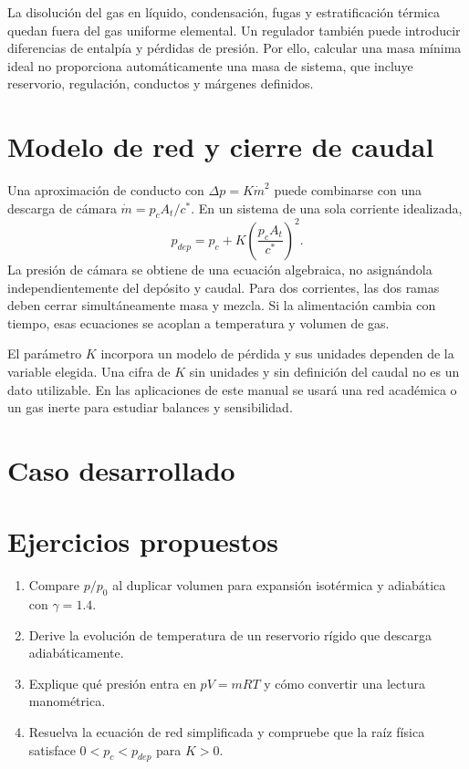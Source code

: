 La disolución del gas en líquido, condensación, fugas y estratificación térmica quedan fuera del gas uniforme elemental. Un regulador también puede introducir diferencias de entalpía y pérdidas de presión. Por ello, calcular una masa mínima ideal no proporciona automáticamente una masa de sistema, que incluye reservorio, regulación, conductos y márgenes definidos.
\section{Modelo de red y cierre de caudal}
Una aproximación de conducto con $\Delta p=K\dot m^2$ puede combinarse con una descarga de cámara $\dot m=p_cA_t/c^*$. En un sistema de una sola corriente idealizada,
\[
 p_{dep}=p_c+K\left(\frac{p_cA_t}{c^*}\right)^2.
\]
La presión de cámara se obtiene de una ecuación algebraica, no asignándola independientemente del depósito y caudal. Para dos corrientes, las dos ramas deben cerrar simultáneamente masa y mezcla. Si la alimentación cambia con tiempo, esas ecuaciones se acoplan a temperatura y volumen de gas.

El parámetro $K$ incorpora un modelo de pérdida y sus unidades dependen de la variable elegida. Una cifra de $K$ sin unidades y sin definición del caudal no es un dato utilizable. En las aplicaciones de este manual se usará una red académica o un gas inerte para estudiar balances y sensibilidad.
\section{Caso desarrollado}

\section{Ejercicios propuestos}
\begin{enumerate}
\item Compare $p/p_0$ al duplicar volumen para expansión isotérmica y adiabática con $\gamma=1.4$.
\item Derive la evolución de temperatura de un reservorio rígido que descarga adiabáticamente.
\item Explique qué presión entra en $pV=mRT$ y cómo convertir una lectura manométrica.
\item Resuelva la ecuación de red simplificada y compruebe que la raíz física satisface $0<p_c<p_{dep}$ para $K>0$.
\end{enumerate}


\studiumchaptercheck
